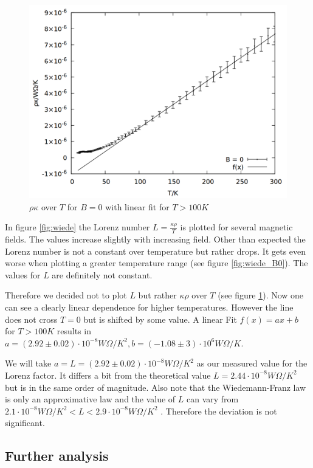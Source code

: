 \begin{figure}
    \centering
    \includegraphics[width=0.7\linewidth]{data/wiede_B0_rhokappa.png}
    \caption{$\rho\kappa$ over $T$ for $B = 0$ with linear fit for $T > 100\si{K}$}
    \label{fig:wiede_B0_rhokappa}
\end{figure}

In figure \ref{fig:wiede} the Lorenz number $L = \frac{\kappa\rho}{T}$ is plotted for several magnetic fields. The values increase slightly with increasing field. Other than expected the Lorenz number is not a constant over temperature but rather drops. It gets even worse when plotting a greater temperature range (see figure \ref{fig:wiede_B0}). The values for $L$ are definitely not constant.

Therefore we decided not to plot $L$ but rather $\kappa\rho$ over $T$ (see figure \ref{fig:wiede_B0_rhokappa}). Now one can see a clearly linear dependence for higher temperatures. However the line does not cross $T= 0$ but is shifted by some value. A linear Fit $f(x) = ax+b$ for $T > 100 \si{K}$ results in $a = (2.92 \pm 0.02) \cdot 10^{-8} \si{W\Omega/K^2}, b = (-1.08 \pm 3) \cdot 10^6 \si{W\Omega/K}$. 

We will take $a = L = (2.92 \pm 0.02) \cdot 10^{-8} \si{W\Omega/K^2}$ as our measured value for the Lorenz factor. It differs a bit from the theoretical value $L = 2.44 \cdot 10^{-8} \si{W\Omega/K^2}$ \cite{wiede} but is in the same order of magnitude. Also note that the Wiedemann-Franz law is only an approximative law and the value of $L$ can vary from $2.1\cdot 10^{-8} \si{W\Omega/K^2} < L < 2.9\cdot 10^{-8} \si{W\Omega/K^2}$ \cite{wiede}. Therefore the deviation is not significant.

\subsection{Further analysis}

